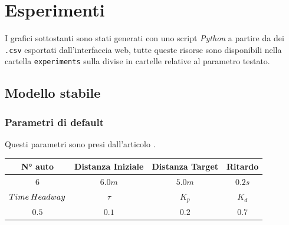 \section{Esperimenti}

I grafici sottostanti sono stati generati con uno script \textit{Python} a partire da dei \texttt{.csv} esportati dall'interfaccia web, tutte queste risorse sono disponibili nella cartella \texttt{experiments} sulla  divise in cartelle relative al parametro testato.



\newpage
\subsection{Modello stabile}


\subsubsection{Parametri di default}
Questi parametri sono presi dall'articolo \cite{ploeg_2014_lp}.

\begin{table}[h]
    \centering
    \begin{tabular}{|c|c|c|c|}
        \hline
        N° auto & Distanza Iniziale & Distanza Target & Ritardo \\
        \hline
        $6$ & $6.0 m$ & $5.0 m$ & $0.2 s$ \\
        \hline
        $Time\hspace{0.2em}Headway$ & $\tau$ & $K_p$ & $K_d$  \\
        \hline
        $0.5$ & $0.1$ & $0.2$ & $0.7$ \\
        \hline
    \end{tabular}
    \label{tab:default_parameters}
\end{table}

